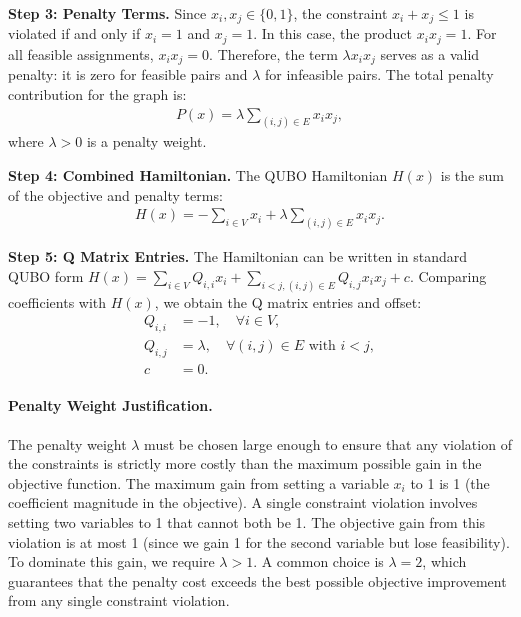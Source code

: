 \documentclass[12pt]{article}
\begin{document}
\textbf{Step 3: Penalty Terms.}
Since $x_i, x_j \in \{0,1\}$, the constraint $x_i + x_j \le 1$ is violated if and only if $x_i = 1$ and $x_j = 1$. In this case, the product $x_i x_j = 1$. For all feasible assignments, $x_i x_j = 0$. Therefore, the term $\lambda x_i x_j$ serves as a valid penalty: it is zero for feasible pairs and $\lambda$ for infeasible pairs. The total penalty contribution for the graph is:
\begin{align}
P(x) = \lambda \sum_{(i,j) \in E} x_i x_j,
\end{align}
where $\lambda > 0$ is a penalty weight.

\textbf{Step 4: Combined Hamiltonian.}
The QUBO Hamiltonian $H(x)$ is the sum of the objective and penalty terms:
\begin{align}
H(x) = -\sum_{i \in V} x_i + \lambda \sum_{(i,j) \in E} x_i x_j.
\end{align}

\textbf{Step 5: Q Matrix Entries.}
The Hamiltonian can be written in standard QUBO form $H(x) = \sum_{i \in V} Q_{i,i} x_i + \sum_{i < j, (i,j) \in E} Q_{i,j} x_i x_j + c$. Comparing coefficients with $H(x)$, we obtain the Q matrix entries and offset:
\begin{align}
Q_{i,i} &= -1, \quad \forall i \in V, \\
Q_{i,j} &= \lambda, \quad \forall (i,j) \in E \text{ with } i < j, \\
c &= 0.
\end{align}

\paragraph{Penalty Weight Justification.}
The penalty weight $\lambda$ must be chosen large enough to ensure that any violation of the constraints is strictly more costly than the maximum possible gain in the objective function. The maximum gain from setting a variable $x_i$ to 1 is 1 (the coefficient magnitude in the objective). A single constraint violation involves setting two variables to 1 that cannot both be 1. The objective gain from this violation is at most 1 (since we gain 1 for the second variable but lose feasibility). To dominate this gain, we require $\lambda > 1$. A common choice is $\lambda = 2$, which guarantees that the penalty cost exceeds the best possible objective improvement from any single constraint violation.
\end{document}
